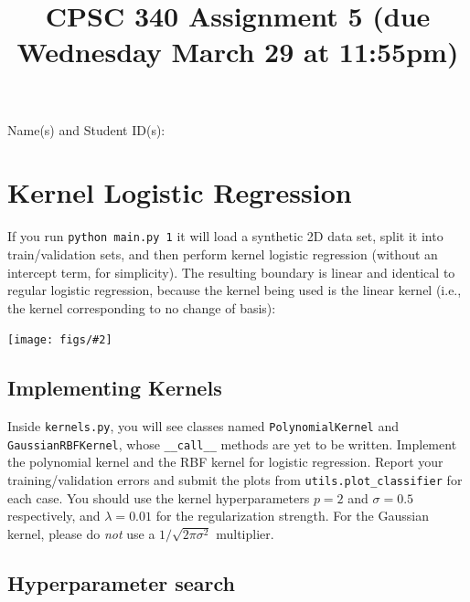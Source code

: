 \documentclass{article}
\def\blu#1{{\color{blu}#1}}
\newcommand{\centerfig}[2]{\begin{center}\texttt{[image: figs/\#2]}\end{center}}
\begin{document}
\title{CPSC 340 Assignment 5 (due Wednesday March 29 at 11:55pm)}
\author{}
\date{}
\maketitle
\vspace{-4em}


\blu{Name(s) and Student ID(s):}

\section{Kernel Logistic Regression}

If you run \verb|python main.py 1| it will load a synthetic 2D data set, split it into train/validation sets, and then perform kernel logistic regression (without an intercept term, for simplicity). The resulting boundary is linear and identical to regular logistic regression, because the kernel being used is the linear kernel (i.e., the kernel corresponding to no change of basis):
\centerfig{0.5}{logReg.png}

\subsection{Implementing Kernels}

Inside \texttt{kernels.py}, you will see classes named \texttt{PolynomialKernel} and \texttt{GaussianRBFKernel}, whose \verb|__call__| methods are yet to be written.
\blu{Implement the polynomial kernel and the RBF kernel for logistic regression. Report your training/validation errors and submit the plots from \texttt{utils.plot\_classifier} for each case.}
You should use the kernel hyperparameters $p=2$ and $\sigma=0.5$ respectively,
and $\lambda=0.01$ for the regularization strength.
For the Gaussian kernel, please do \emph{not} use a $1/\sqrt{2\pi\sigma^2}$ multiplier.

\pagebreak 

\subsection{Hyperparameter search}
\end{document}
